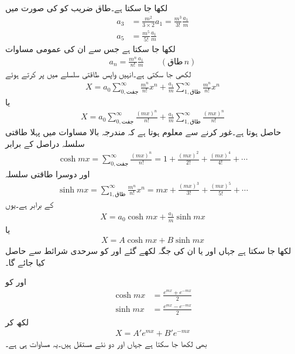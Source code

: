 لکھا جا سکتا ہے۔طاق ضریب کو  کی صورت میں
\begin{align*}
a_3&=\frac{m^2}{3\times 2} a_1=\frac{m^3}{3!} \frac{a_1}{m}\\
a_5&=\frac{m^5}{5!}\frac{a_1}{m}
\end{align*}
لکھا جا سکتا ہے جس سے ان کی عمومی مساوات
\begin{align*}
a_n=\frac{m^n}{n!}\frac{a_1}{m} \quad \quad (\text{طاق} \, n)
\end{align*}
لکھی جا سکتی ہے۔انہیں واپس طاقتی سلسلے میں پر کرتے ہوئے
\begin{align*}
X=a_0 \sum_{0,\text{جفت}}^{\infty} \frac{m^n}{n!}x^n+\frac{a_1}{m}\sum_{1,\text{طاق}}^{\infty} \frac{m^n}{n!}x^n
\end{align*}
یا
\begin{align*}
X=a_0 \sum_{0,\text{جفت}}^{\infty} \frac{(mx)^n}{n!}+\frac{a_1}{m}\sum_{1,\text{طاق}}^{\infty} \frac{(mx)^n}{n!}
\end{align*}
حاصل ہوتا ہے۔غور کرنے سے معلوم ہوتا ہے کہ مندرجہ بالا مساوات میں پہلا طاقتی سلسلہ دراصل  کے برابر
\begin{align*}
\cosh mx=\sum_{0,\text{جفت}}^{\infty} \frac{(mx)^n}{n!}=1+\frac{(mx)^2}{2!}+\frac{(mx)^4}{4!}+\cdots
\end{align*}
 اور دوسرا طاقتی سلسلہ 
\begin{align*}
\sinh mx=\sum_{1,\text{طاق}}^{\infty} \frac{m^n}{n!}x^n=mx+\frac{(mx)^3}{3!}+\frac{(mx)^5}{5!}+\cdots
\end{align*}
کے برابر ہے۔یوں
\begin{align*}
X=a_0 \cosh mx+\frac{a_1}{m} \sinh mx
\end{align*}
یا
\begin{align*}
X=A \cosh mx+B \sinh mx
\end{align*}
لکھا جا سکتا ہے جہاں  اور  یا ان کی جگہ لکھے گئے  اور   کو سرحدی شرائط سے حاصل کیا جائے گا۔

 اور  کو
\begin{align*}
\cosh mx&=\frac{e^{mx}+e^{-mx}}{2}\\
\sinh mx&=\frac{e^{mx}-e^{-mx}}{2}
\end{align*}
لکھ کر 
\begin{align*}
X=A' e^{mx}+B' e^{-mx}
\end{align*}
بھی لکھا جا سکتا ہے جہاں  اور  دو نئے مستقل ہیں۔یہ مساوات  ہی ہے۔

